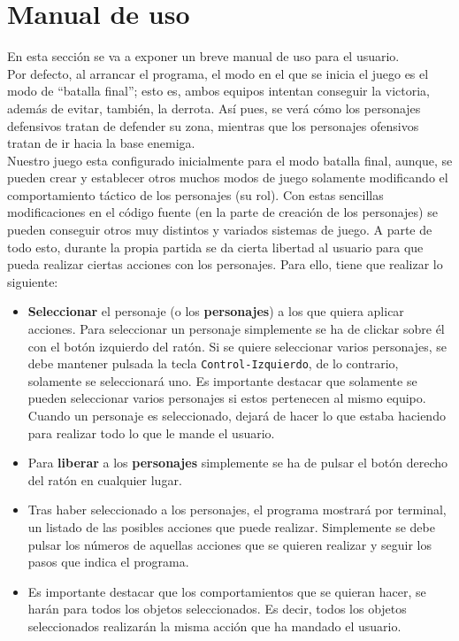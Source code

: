 \medskip
\section{Manual de uso}
En esta sección se va a exponer un breve manual de uso para el usuario. \\

Por defecto, al arrancar el programa, el modo en el que se inicia el juego es el modo de ``batalla final''; esto es, ambos equipos intentan conseguir la victoria, además de evitar, también, la derrota. Así pues, se verá cómo los personajes defensivos tratan de defender su zona, mientras que los personajes ofensivos tratan de ir hacia la base enemiga. \\

Nuestro juego esta configurado inicialmente para el modo batalla final, aunque, se pueden crear y establecer otros muchos modos de juego solamente modificando el comportamiento táctico de los personajes (su rol). Con estas sencillas modificaciones en el código fuente (en la parte de creación de los personajes) se pueden conseguir otros muy distintos y variados sistemas de juego. A parte de todo esto, durante la propia partida se da cierta libertad al usuario para que pueda realizar ciertas acciones con los personajes. Para ello, tiene que realizar lo siguiente:

\begin{itemize}
 \item \textbf{Seleccionar} el personaje (o los \textbf{personajes}) a los que quiera aplicar acciones. Para seleccionar un personaje simplemente se ha de clickar sobre él con el botón izquierdo del ratón. Si se quiere seleccionar varios personajes, se debe mantener pulsada la tecla \texttt{Control-Izquierdo}, de lo contrario, solamente se seleccionará uno. Es importante destacar que solamente se pueden seleccionar varios personajes si estos pertenecen al mismo equipo. Cuando un personaje es seleccionado, dejará de hacer lo que estaba haciendo para realizar todo lo que le mande el usuario.
 
 \item Para \textbf{liberar} a los \textbf{personajes} simplemente se ha de pulsar el botón derecho del ratón en cualquier lugar.
 
 \item Tras haber seleccionado a los personajes, el programa mostrará por terminal, un listado de las posibles acciones que puede realizar. Simplemente se debe pulsar los números de aquellas acciones que se quieren realizar y seguir los pasos que indica el programa.
 \item Es importante destacar que los comportamientos que se quieran hacer, se harán para todos los objetos seleccionados. Es decir, todos los objetos seleccionados realizarán la misma acción que ha mandado el usuario.
\end{itemize}

